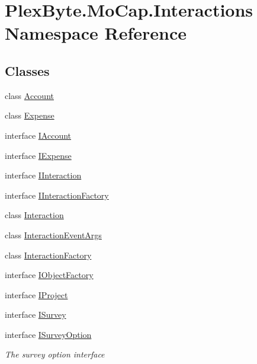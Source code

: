 \hypertarget{namespace_plex_byte_1_1_mo_cap_1_1_interactions}{}\section{Plex\+Byte.\+Mo\+Cap.\+Interactions Namespace Reference}
\label{namespace_plex_byte_1_1_mo_cap_1_1_interactions}
\subsection*{Classes}
\begin{DoxyCompactItemize}
\item 
class \hyperlink{class_plex_byte_1_1_mo_cap_1_1_interactions_1_1_account}{Account}
\item 
class \hyperlink{class_plex_byte_1_1_mo_cap_1_1_interactions_1_1_expense}{Expense}
\item 
interface \hyperlink{interface_plex_byte_1_1_mo_cap_1_1_interactions_1_1_i_account}{I\+Account}
\item 
interface \hyperlink{interface_plex_byte_1_1_mo_cap_1_1_interactions_1_1_i_expense}{I\+Expense}
\item 
interface \hyperlink{interface_plex_byte_1_1_mo_cap_1_1_interactions_1_1_i_interaction}{I\+Interaction}
\item 
interface \hyperlink{interface_plex_byte_1_1_mo_cap_1_1_interactions_1_1_i_interaction_factory}{I\+Interaction\+Factory}
\item 
class \hyperlink{class_plex_byte_1_1_mo_cap_1_1_interactions_1_1_interaction}{Interaction}
\item 
class \hyperlink{class_plex_byte_1_1_mo_cap_1_1_interactions_1_1_interaction_event_args}{Interaction\+Event\+Args}
\item 
class \hyperlink{class_plex_byte_1_1_mo_cap_1_1_interactions_1_1_interaction_factory}{Interaction\+Factory}
\item 
interface \hyperlink{interface_plex_byte_1_1_mo_cap_1_1_interactions_1_1_i_object_factory}{I\+Object\+Factory}
\item 
interface \hyperlink{interface_plex_byte_1_1_mo_cap_1_1_interactions_1_1_i_project}{I\+Project}
\item 
interface \hyperlink{interface_plex_byte_1_1_mo_cap_1_1_interactions_1_1_i_survey}{I\+Survey}
\item 
interface \hyperlink{interface_plex_byte_1_1_mo_cap_1_1_interactions_1_1_i_survey_option}{I\+Survey\+Option}
\begin{DoxyCompactList}\small\item\em The survey option interface \end{DoxyCompactList}\item 

\end{DoxyCompactItemize}
